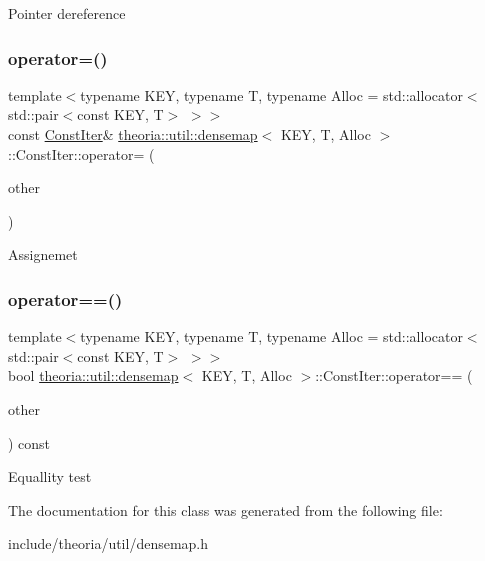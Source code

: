 Pointer dereference \mbox{\label{classtheoria_1_1util_1_1densemap_1_1ConstIter_a8c7a0c2774a2d4cb22aa82f83585dd27}} 
\subsubsection{\texorpdfstring{operator=()}{operator=()}}
{\footnotesize\ttfamily template$<$typename K\+EY, typename T, typename Alloc = std\+::allocator$<$std\+::pair$<$const K\+E\+Y, T$>$ $>$$>$ \\
const \hyperlink{classtheoria_1_1util_1_1densemap_1_1ConstIter}{Const\+Iter}\& \hyperlink{classtheoria_1_1util_1_1densemap}{theoria\+::util\+::densemap}$<$ K\+EY, T, Alloc $>$\+::Const\+Iter\+::operator= (\begin{DoxyParamCaption}\item[{const \hyperlink{classtheoria_1_1util_1_1densemap_1_1ConstIter}{Const\+Iter} \&}]{other }\end{DoxyParamCaption})\hspace{0.3cm}{\ttfamily [inline]}}

Assignemet \mbox{\label{classtheoria_1_1util_1_1densemap_1_1ConstIter_a4fb1efa9f5b9594d3e05a00a04f4e774}} 
\subsubsection{\texorpdfstring{operator==()}{operator==()}}
{\footnotesize\ttfamily template$<$typename K\+EY, typename T, typename Alloc = std\+::allocator$<$std\+::pair$<$const K\+E\+Y, T$>$ $>$$>$ \\
bool \hyperlink{classtheoria_1_1util_1_1densemap}{theoria\+::util\+::densemap}$<$ K\+EY, T, Alloc $>$\+::Const\+Iter\+::operator== (\begin{DoxyParamCaption}\item[{const \hyperlink{classtheoria_1_1util_1_1densemap_1_1ConstIter}{Const\+Iter} \&}]{other }\end{DoxyParamCaption}) const\hspace{0.3cm}{\ttfamily [inline]}}

Equallity test 

The documentation for this class was generated from the following file\+:\begin{DoxyCompactItemize}
\item 
include/theoria/util/densemap.\+h\end{DoxyCompactItemize}
